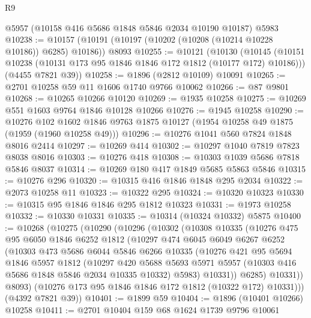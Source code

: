 \begin{lexlean}{R9}
\begin{coremodule}
    @5957
    (@10158 @416 @5686 @1848 @5846 @2034 @10190 @10187)
    @5983
@10238 := @10157 (@10191 (@10197 (@10202 (@10208 (@10214 @10228 @10186)) @6285) @10186)) @8093
@10255 := @10121
    (@10130
      (@10145 (@10151 @10238 (@10131 @173 @95 @1846 @1846 @172 @1812 (@10177 @172) @10186)))
      (@4455 @7821 @39))
@10258 := @1896 (@2812 @10109) @10091
@10265 := @2701 @10258 @59 @11 @1606 @1740 @9766 @10062
@10266 := @87 @9801
@10268 := @10265 @10266 @10120
@10269 := @1935 @10258
@10275 := @10269 @551 @1603 @9764 @1846 @10128 @10266
@10276 := @1945 @10258
@10290 := @10276
    @102
    @1602
    @1846
    @9763
    @1875
    @10127
    (@1954 @10258 @49 @1875 (@1959 (@1960 @10258 @49)))
@10296 := @10276 @1041 @560 @7824 @1848 @8016 @2414
@10297 := @10269 @414
@10302 := @10297 @1040 @7819 @7823 @8038 @8016
@10303 := @10276 @418
@10308 := @10303 @1039 @5686 @7818 @5846 @8037
@10314 := @10269 @180 @417 @1849 @5685 @5863 @5846
@10315 := @10276 @296
@10320 := @10315 @416 @1846 @1848 @295 @2034
@10322 := @2073 @10258 @11
@10323 := @10322 @295
@10324 := @10320 @10323
@10330 := @10315 @95 @1846 @1846 @295 @1812 @10323
@10331 := @1973 @10258
@10332 := @10330 @10331
@10335 := @10314 (@10324 @10332) @5875
@10400 := @10268
    (@10275
      (@10290
        (@10296
          (@10302
            (@10308
              @10335
              (@10276
                @475
                @95
                @6050
                @1846
                @6252
                @1812
                (@10297
                  @474
                  @6045
                  @6049
                  @6267
                  @6252
                  (@10303
                    @473
                    @5686
                    @6044
                    @5846
                    @6266
                    @10335
                    (@10276
                      @421
                      @95
                      @5694
                      @1846
                      @5957
                      @1812
                      (@10297
                        @420
                        @5688
                        @5693
                        @5971
                        @5957
                        (@10303 @416 @5686 @1848 @5846 @2034 @10335 @10332)
                        @5983)
                      @10331))
                  @6285)
                @10331))
            @8093)
          (@10276 @173 @95 @1846 @1846 @172 @1812 (@10322 @172) @10331)))
      (@4392 @7821 @39))
@10401 := @1899 @59
@10404 := @1896 (@10401 @10266) @10258
@10411 := @2701 @10404 @159 @68 @1624 @1739 @9796 @10061

\end{coremodule}
\end{lexlean}
